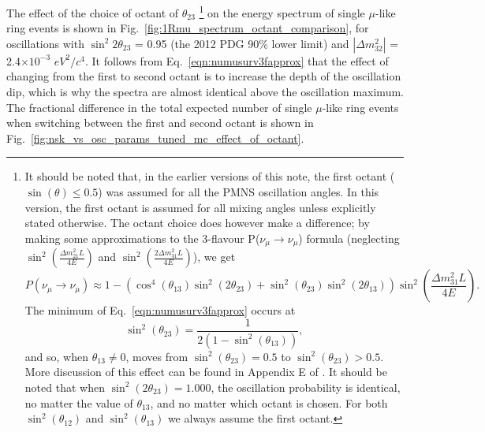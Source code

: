 The effect of the choice of octant of $\theta_{23}$ \footnote{
  It should be noted that, in the earlier versions of this note, the first octant ($\sin(\theta) \leq 0.5$) was assumed for all the PMNS oscillation angles. 
In this version, the first octant is assumed for all mixing angles unless explicitly stated otherwise.
The octant choice does however make a difference;
by making some approximations to the 3-flavour P($\nu_{\mu}\rightarrow\nu_{\mu}$) formula %
(neglecting $\sin^2\left(\frac{\Delta m^2_{21} L}{4E}\right)$ and $\sin^2\left(\frac{2 \Delta m^2_{31} L}{4E}\right)$), %
we get
\begin{equation}
  P(\nu_{\mu}\rightarrow\nu_{\mu})
  \approx 1 - \left( \cos^4(\theta_{13})\sin^2(2\theta_{23}) + \sin^2(\theta_{23})\sin^2(2\theta_{13}) \right) \sin^2\left(\frac{\Delta m_{31}^{2} L}{4E}\right). %
  \label{eqn:numusurv3fapprox}
\end{equation}
The minimum of Eq.\ \ref{eqn:numusurv3fapprox} occurs at
\begin{equation}
  \sin^2(\theta_{23})
  = \frac{1}{2(1-\sin^2(\theta_{13}))},
  \label{eqn:numusurv3fmin}
\end{equation}
and so, when $\theta_{13} \ne 0$, moves from $\sin^2(\theta_{23}) = 0.5$ to $\sin^2(\theta_{23}) > 0.5$.
More discussion of this effect can be found in Appendix E of \cite{OurRun123JointOscillationAnalysis}.
It should be noted that when $\sin^2(2\theta_{23}) = 1.000$, the oscillation probability is identical,
no matter the value of $\theta_{13}$, and no matter which octant is chosen.
For both $\sin^2(\theta_{12})$ and $\sin^2(\theta_{13})$ we always assume the first octant.
} on the energy spectrum of
single $\mu$-like ring events is shown in Fig.\
\ref{fig:1Rmu_spectrum_octant_comparison}, for oscillations with
$\sin^{2}2\theta_{23}$ = 0.95 (the 2012 PDG 90\% lower limit) and
$|\Delta m^{2}_{32}|$ = 2.4$\times10^{-3}$ $eV^{2}/c^{4}$.
It follows from Eq.\ \ref{eqn:numusurv3fapprox} that the effect of changing from the first to second octant is 
to increase the depth of the oscillation dip, which is why the spectra are almost identical above the oscillation maximum.
The fractional difference in the total expected number of single $\mu$-like ring events when switching between the first and second octant
is shown in Fig.\ \ref{fig:nsk_vs_osc_params_tuned_mc_effect_of_octant}.

